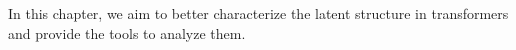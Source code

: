 In this chapter, we aim to better characterize the latent structure in transformers and provide the tools to analyze them.












